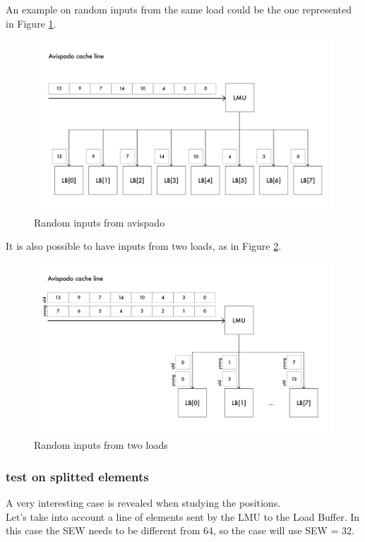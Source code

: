 An example on random inputs from the same load could be the one represented in Figure \ref{cache-to-lb-rnd-ex}.

\begin{figure}[H]
    \centering
    \includegraphics[scale = 0.6]{Chapter_2/img/cache-to-lb-rnd-ex.png}
    \caption{Random inputs from avispado}
    \label{cache-to-lb-rnd-ex}
\end{figure}

It is also possible to have inputs from two loads, as in Figure \ref{cache-to-lb-ooo-ex}.

\begin{figure}[H]
    \centering
    \includegraphics[scale = 0.6]{Chapter_2/img/cache-to-lb-ooo-ex.png}
    \caption{Random inputs from two loads}
    \label{cache-to-lb-ooo-ex}
\end{figure}

\subsubsection{test on splitted elements} 
A very interesting case is revealed when studying the positions.\\
Let's take into account a line of elements sent by the LMU to the Load Buffer. In this case the SEW needs to be different from 64, so the case will use SEW = 32.\\

